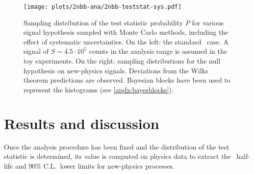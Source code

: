 \begin{figure}
  \centering
  \texttt{[image: plots/2nbb-ana/2nbb-teststat-sys.pdf]}
  \caption{%
    Sampling distribution of the test statistic probability $P$ for various signal
    hypothesis sampled with Monte Carlo methods, including the effect of systematic
    uncertainties. On the left: the standard \nnbb\ case. A signal of $S \sim 4.5 \cdot
    10^5$ counts in the analysis range is assumed in the toy experiments. On the right:
    sampling distributions for the null hypothesis on new-physics signals.  Deviations
    from the Wilks theorem predictions are observed. Bayesian blocks have been used to
    represent the histograms (see \cref{apdx:bayesblocks}).
  }\label{fig:2nbb-ana:ts-dist-sys}
\end{figure}

\begin{table}
  \centering
  \caption{%
    Summary of the systematic uncertainties affecting the \nnbb\ distribution analysis.
    For brevity, only results for the ordinary \nnbb\ half-life estimate and the \onbbx\
    ($n=1$) 90\% C.L.~lower limit are reported.
  }\label{tab:2nbb-ana:systematics}
  
\end{table}

\section{Results and discussion}%
\label{sec:2nbb-ana:results}

Once the analysis procedure has been fixed and the distribution of the test statistic is
determined, its value is computed on physics data to extract the \nnbb\ half-life and 90\%
C.L.~lower limits for new-physics processes.

